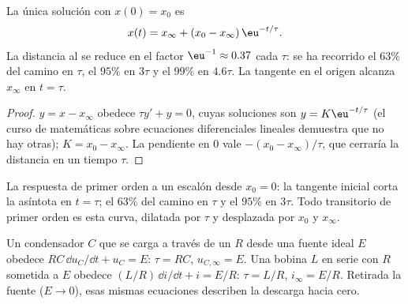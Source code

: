 \begin{theorem}[Solución]\label{thm:b1:transient-regimes:firstorder}
La única solución con $x(0) = x_0$ es
\[
x(t) = x_\infty + (x_0 - x_\infty)\,\eu^{-t/\tau} .
\]
La distancia al  se reduce en el factor $\eu^{-1} \approx
0.37$ cada $\tau$: se ha recorrido el $63\%$ del camino en $\tau$, el
$95\%$ en $3\tau$ y el $99\%$ en $4.6\tau$. La tangente en el origen
alcanza $x_\infty$ en $t = \tau$.
\end{theorem}

\begin{proof}
$y = x - x_\infty$ obedece $\tau y' + y = 0$, cuyas soluciones son
$y = K\eu^{-t/\tau}$ (el curso de matemáticas sobre ecuaciones
diferenciales lineales demuestra que no hay otras); $K = x_0 - x_\infty$.
La pendiente en $0$ vale $-(x_0 - x_\infty)/\tau$, que cerraría la
distancia en un tiempo $\tau$.
\end{proof}

\begin{omfigure}

{\small La respuesta de primer orden a un escalón desde $x_0 = 0$: la
tangente inicial corta la asíntota en $t = \tau$; el $63\%$ del camino en
$\tau$ y el $95\%$ en $3\tau$. Todo transitorio de primer orden es esta
curva, dilatada por $\tau$ y desplazada por $x_0$ y $x_\infty$.}
\end{omfigure}

\begin{proposition}[Circuitos RC y RL]\label{prop:b1:transient-regimes:rcrl}
Un condensador $C$ que se carga a través de un  $R$ desde una
fuente ideal $E$ obedece $RC\,\dd u_C/\dd t + u_C = E$: $\tau = RC$,
$u_{C,\infty} = E$. Una bobina $L$ en serie con $R$ sometida a $E$ obedece $(L/R)\,\dd i/\dd t + i =
E/R$: $\tau = L/R$, $i_\infty = E/R$. Retirada la fuente ($E \to 0$), esas
mismas ecuaciones describen la descarga hacia cero.
\end{proposition}

